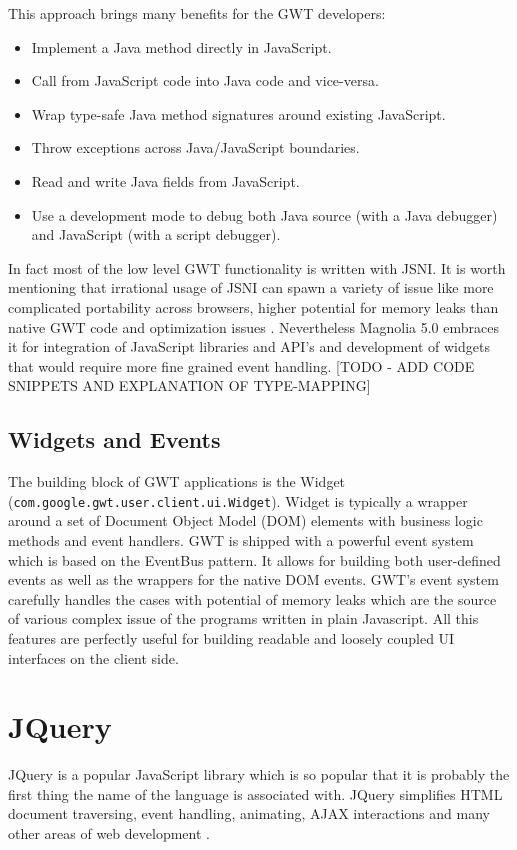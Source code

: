 This approach brings many benefits for the GWT developers\cite{jsni}:
\begin{itemize} 
	\item Implement a Java method directly in JavaScript.
	\item Call from JavaScript code into Java code and vice-versa.
	\item Wrap type-safe Java method signatures around existing JavaScript.
	\item Throw exceptions across Java/JavaScript boundaries.
	\item Read and write Java fields from JavaScript.
	\item Use a development mode to debug both Java source (with a Java debugger) and JavaScript (with a script debugger).
\end{itemize}
In fact most of the low level GWT functionality is written with JSNI. It is
worth mentioning that irrational usage of JSNI can spawn a variety of issue like
more complicated portability across browsers, higher potential for memory leaks
than native GWT code and optimization issues \cite{jsni}. Nevertheless Magnolia
5.0 embraces it for integration of JavaScript libraries and API's and
development of widgets that would require more fine grained event handling.
[TODO - ADD CODE SNIPPETS AND EXPLANATION OF TYPE-MAPPING]

\subsection{Widgets and Events} 
The building block of GWT applications is the Widget
(\texttt{com.google.gwt.user.client.ui.Widget}).
Widget is typically a wrapper around a set of Document Object Model (DOM)
elements with business logic methods and event handlers. GWT is shipped with a
powerful event system which is based on the EventBus pattern. It allows for
building both user-defined events as well as the wrappers for the native DOM
events. GWT's event system carefully handles the cases with potential of memory
leaks \cite{gwt_memory_leaks} which are the source of various complex issue of
the programs written in plain Javascript. All this features are perfectly useful
for building readable and loosely coupled UI interfaces on the client side.

\section{JQuery}
JQuery is a popular JavaScript library which is so popular that it is probably
the first thing the name of the language is associated with. JQuery simplifies
HTML document traversing, event handling, animating, AJAX interactions and many
other areas of web development \cite{jquery}. 

